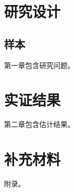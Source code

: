 \documentclass[UTF8,fontset=fandol,zihao=-4,oneside]{ctexrep}
\begin{document}
\tableofcontents\chapter{研究设计}\section{样本}第一章包含研究问题。
\chapter{实证结果}第二章包含估计结果。
\appendix\chapter{补充材料}附录。
\end{document}
